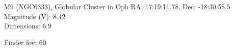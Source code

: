 \begin{block}{M9 (NGC6333), Globular Cluster in Oph}
    RA: 17:19:11.78, Dec: -18:30:58.5 \\ 
    Magnitude (V): 8.42 \\ 
    Dimensions: 6.9 

    Finder fov: 60 
\end{block}